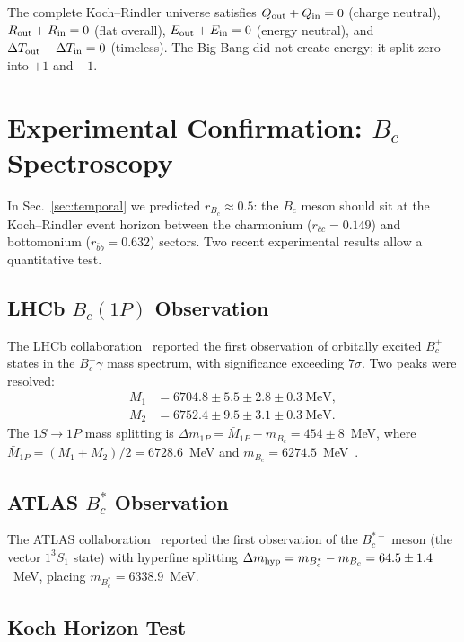\documentclass[twocolumn,showpacs,preprintnumbers,amsmath,amssymb,prl]{revtex4-2}
\begin{document}
The complete Koch--Rindler universe satisfies
$Q_{\rm out} + Q_{\rm in} = 0$ (charge neutral),
$R_{\rm out} + R_{\rm in} = 0$ (flat overall),
$E_{\rm out} + E_{\rm in} = 0$ (energy neutral), and
$\Delta T_{\rm out} + \Delta T_{\rm in} = 0$ (timeless).
The Big Bang did not create energy; it split zero into $+1$ and $-1$.

\section{Experimental Confirmation: $B_c$ Spectroscopy}
\label{sec:bc}

In Sec.~\ref{sec:temporal} we predicted $r_{B_c} \approx 0.5$: the
$B_c$ meson should sit at the Koch--Rindler event horizon between the
charmonium ($r_{\bar{c}c} = 0.149$) and bottomonium
($r_{\bar{b}b} = 0.632$) sectors. Two recent experimental results
allow a quantitative test.

\subsection{LHCb $B_c(1P)$ Observation}

The LHCb collaboration~\cite{LHCbBc1P} reported the first observation
of orbitally excited $B_c^+$ states in the $B_c^+\gamma$ mass spectrum,
with significance exceeding $7\sigma$. Two peaks were resolved:
\begin{align}
    M_1 &= 6704.8 \pm 5.5 \pm 2.8 \pm 0.3~\text{MeV}, \label{eq:bc1p1}\\
    M_2 &= 6752.4 \pm 9.5 \pm 3.1 \pm 0.3~\text{MeV}. \label{eq:bc1p2}
\end{align}
The $1S \to 1P$ mass splitting is
$\Delta m_{1P} = \bar{M}_{1P} - m_{B_c} = 454 \pm 8$~MeV,
where $\bar{M}_{1P} = (M_1 + M_2)/2 = 6728.6$~MeV and
$m_{B_c} = 6274.5$~MeV~\cite{PDG2024}.

\subsection{ATLAS $B_c^*$ Observation}

The ATLAS collaboration~\cite{ATLASBcStar} reported the first
observation of the $B_c^{*+}$ meson (the vector $1^3S_1$ state) with
hyperfine splitting $\Delta m_{\rm hyp} = m_{B_c^*} - m_{B_c}
= 64.5 \pm 1.4$~MeV, placing $m_{B_c^*} = 6338.9$~MeV.

\subsection{Koch Horizon Test}
\end{document}
